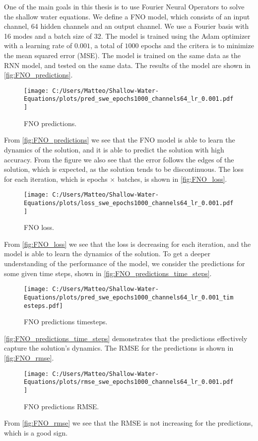 One of the main goals in this thesis is to use Fourier Neural Operators to solve the shallow water equations.
We define a FNO model, which consists of an input channel, 64 hidden channels and an output channel. We use a Fourier basis with 16 modes and a batch size of 32.
The model is trained using the Adam optimizer with a learning rate of $0.001$, a total of $1000$ epochs and the critera is to minimize the mean squared error (MSE).
The model is trained on the same data as the RNN model, and tested on the same data.
The results of the model are shown in \autoref{fig:FNO_predictions}.
\begin{figure}[H]
    \centering
    \texttt{[image: C:/Users/Matteo/Shallow-Water-Equations/plots/pred\_swe\_epochs1000\_channels64\_lr\_0.001.pdf]}
    \caption{FNO predictions.}\label{fig:FNO_predictions}
\end{figure}
From \autoref{fig:FNO_predictions} we see that the FNO model is able to learn the dynamics of the solution, and it is able to predict the solution with high accuracy.
From the figure we also see that the error follows the edges of the solution, which is expected, as the solution tends to be discontinuous.
The loss for each iteration, which is epochs $\times$ batches, is shown in \autoref{fig:FNO_loss}.
\begin{figure}[H]
    \centering
    \texttt{[image: C:/Users/Matteo/Shallow-Water-Equations/plots/loss\_swe\_epochs1000\_channels64\_lr\_0.001.pdf]}
    \caption{FNO loss.}\label{fig:FNO_loss}
\end{figure}
From \autoref{fig:FNO_loss} we see that the loss is decreasing for each iteration, and the model is able to learn the dynamics of the solution.
To get a deeper understanding of the performance of the model, we consider the predictions for some given time steps, shown in \autoref{fig:FNO_predictions_time_steps}.
\begin{figure}[H]
    \centering
    \texttt{[image: C:/Users/Matteo/Shallow-Water-Equations/plots/pred\_swe\_epochs1000\_channels64\_lr\_0.001\_timesteps.pdf]}
    \caption{FNO predictions timesteps.}\label{fig:FNO_predictions_time_steps}
\end{figure}
\autoref{fig:FNO_predictions_time_steps} demonstrates that the predictions effectively capture the solution's dynamics.
The RMSE for the predictions is shown in \autoref{fig:FNO_rmse}.
\begin{figure}[H]
    \centering
    \texttt{[image: C:/Users/Matteo/Shallow-Water-Equations/plots/rmse\_swe\_epochs1000\_channels64\_lr\_0.001.pdf]}
    \caption{FNO predictions RMSE.}\label{fig:FNO_rmse}
\end{figure}
From \autoref{fig:FNO_rmse} we see that the RMSE is not increasing for the predictions, which is a good sign.


